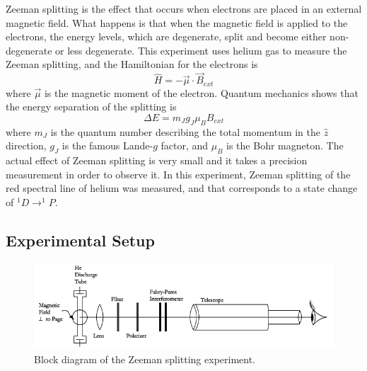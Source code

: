 \documentclass[11pt,letterpaper]{article}
\begin{document}
Zeeman splitting is the effect that occurs when electrons are placed in an
external magnetic field. What happens is that when the magnetic field is applied
to the electrons, the energy levels, which are degenerate, split and become
either non-degenerate or less degenerate. This experiment uses helium gas to
measure the Zeeman splitting, and the Hamiltonian for the electrons is
\begin{equation}
    \hat{H} = -\vec{\mu} \cdot \vec{B}_{ext}
\end{equation}
where $\vec{\mu}$ is the magnetic moment of the electron. Quantum mechanics
shows that the energy separation of the splitting is \cite{BransdenQM}
\begin{equation}
    \Delta E = m_J g_J \mu_B B_{ext}
\end{equation}
where $m_J$ is the quantum number describing the total momentum in the $\hat{z}$
direction, $g_J$ is the famous Lande-$g$ factor, and $\mu_B$ is the Bohr
magneton. The actual effect of Zeeman splitting is very small and it takes a
precision measurement in order to observe it. In this experiment, Zeeman
splitting of the red spectral line of helium was measured, and that corresponds
to a state change of $^1D \rightarrow ^1P$.


\subsection{Experimental Setup}

\begin{figure}
    \centering
    \includegraphics[width=\textwidth]{figures/Atm1image004.png}
    \caption{Block diagram of the Zeeman splitting experiment.}
    \label{zeeblock}
\end{figure}
\end{document}
